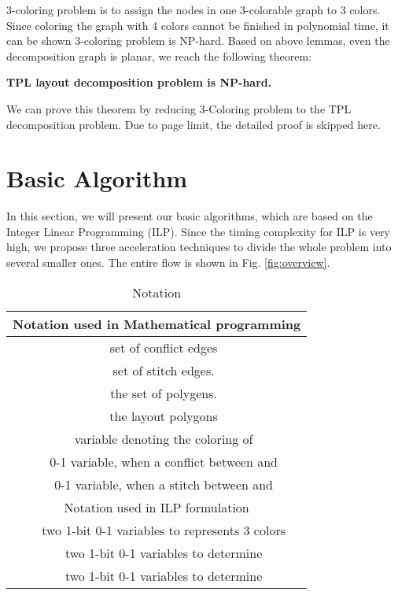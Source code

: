 \documentclass[10pt,conference]{IEEEtran}
\begin{document}
3-coloring problem is to assign the nodes in one 3-colorable graph to 3 colors.
Since coloring the graph with 4 colors cannot be finished in polynomial time, it can be shown 3-coloring problem is NP-hard.
Based on above lemmas, even the decomposition graph is planar, we reach the following theorem:

\begin{theorem}
\textbf{TPL layout decomposition problem is NP-hard.}
\end{theorem}

We can prove this theorem by reducing 3-Coloring problem to the TPL decomposition problem.
Due to page limit, the detailed proof is skipped here.



 \section{Basic Algorithm}
\label{chap:basic}

In this section, we will present our basic algorithms, which are based on the Integer Linear Programming (ILP).
Since the timing complexity for ILP is very high, we propose three acceleration techniques to divide the whole problem into several smaller ones. 
The entire flow is shown in Fig. \ref{fig:overview}.


\begin{table}[bt]
\renewcommand{\arraystretch}{1.3}
\centering 
\caption{Notation}
\label{table:ilp}
\begin{tabular}{|c|c|}
	\hline \hline
	\multicolumn{2}{|c|}{Notation used in Mathematical programming}\\
	\hline
			& set of conflict edges\\
	\hline
			& set of stitch edges.\\
	\hline
			& the set of polygens.\\
	\hline
			& the  layout polygons\\
	\hline
			& variable denoting the coloring of \\
	\hline
		& 0-1 variable,  when a conflict between  and \\
	\hline
		& 0-1 variable,  when a stitch between  and \\
	\hline
	\multicolumn{2}{|c|}{Notation used in ILP formulation}\\
	\hline
	 & two 1-bit 0-1 variables to represents 3 colors\\
	\hline
	 & two 1-bit 0-1 variables to determine \\
	\hline
	 & two 1-bit 0-1 variables to determine \\
	\hline\hline
\end{tabular}
\end{table}
\end{document}
